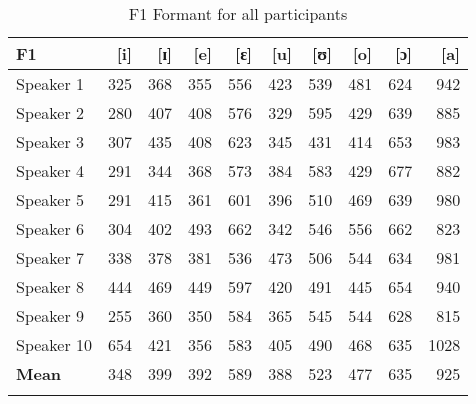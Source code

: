 \documentclass[output=paper,
modfonts
]{langscibook}
\begin{document}
\begin{table}[p]
\caption{F1 Formant for all participants}
\label{tab:koffi:3}
\begin{tabularx}{\textwidth}{Xrrrrrrrrr}
\lsptoprule
 {\textbf{F1}} &  {[i]} &  {[ɪ]} &  {[e]} &  {[ɛ]} &  {[u]} &  {[ʊ]} &  {[o]} &  {[ɔ]} &  {[a]}\\
\midrule
 {Speaker 1} &  {325} &  {368} &  {355} &  {556} &  {423} &  {539} &  {481} &  {624} &  {942} \\
 {Speaker 2} &  {280} &  {407} &  {408} &  {576} &  {329} &  {595} &  {429} &  {639} &  {885}\\
 {Speaker 3} &  {307} &  {435} &  {408} &  {623} &  {345} &  {431} &  {414} &  {653} &  {983}\\
 {Speaker 4} &  {291} &  {344} &  {368} &  {573} &  {384} &  {583} &  {429} &  {677} &  {882} \\
 {Speaker 5} &  {291} &  {415} &  {361} &  {601} &  {396} &  {510} &  {469} &  {639} &  {980}\\
 {Speaker 6} &  {304} &  {402} &  {493} &  {662} &  {342} &  {546} &  {556} &  {662} &  {823}\\
 {Speaker 7} &  {338} &  {378} &  {381} &  {536} &  {473} &  {506} &  {544} &  {634} &  {981}\\
 {Speaker 8} &  {444} &  {469} &  {449} &  {597} &  {420} &  {491} &  {445} &  {654} &  {940}\\
 {Speaker 9} &  {255} &  {360} &  {350} &  {584} &  {365} &  {545} &  {544} &  {628} &  {815}\\
 {Speaker 10} &  {654} &  {421} &  {356} &  {583} &  {405} &  {490} &  {468} &  {635} &  {1028}\\
\midrule 
 {\textbf{Mean}} &  {348} &  {399} &  {392} &  {589} &  {388} &  {523} &  {477} &  {635} &  {925}\\
\lspbottomrule
\end{tabularx} 
\end{table}
\end{document}
